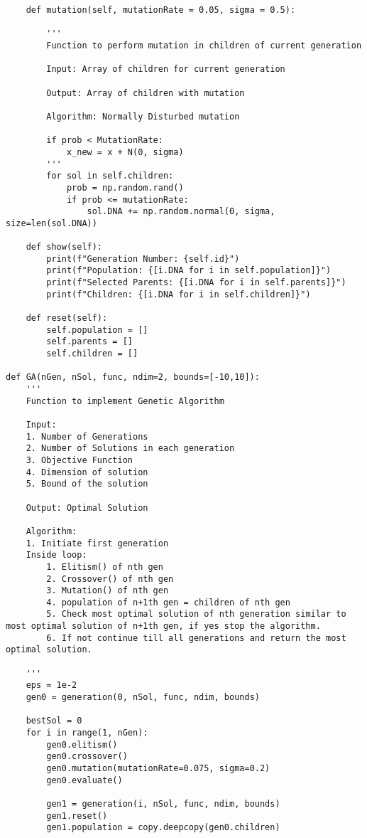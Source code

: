 \documentclass[12pt,a4paper,oneside]{paper} %
\begin{document}
\begin{verbatim}
    def mutation(self, mutationRate = 0.05, sigma = 0.5):

        '''
        Function to perform mutation in children of current generation

        Input: Array of children for current generation

        Output: Array of children with mutation

        Algorithm: Normally Disturbed mutation

        if prob < MutationRate:
            x_new = x + N(0, sigma)
        '''
        for sol in self.children:
            prob = np.random.rand()
            if prob <= mutationRate:
                sol.DNA += np.random.normal(0, sigma, size=len(sol.DNA))
        
    def show(self):
        print(f"Generation Number: {self.id}")
        print(f"Population: {[i.DNA for i in self.population]}")
        print(f"Selected Parents: {[i.DNA for i in self.parents]}")
        print(f"Children: {[i.DNA for i in self.children]}")

    def reset(self):
        self.population = []
        self.parents = []
        self.children = []

def GA(nGen, nSol, func, ndim=2, bounds=[-10,10]):
    '''
    Function to implement Genetic Algorithm

    Input: 
    1. Number of Generations
    2. Number of Solutions in each generation
    3. Objective Function
    4. Dimension of solution
    5. Bound of the solution

    Output: Optimal Solution

    Algorithm:
    1. Initiate first generation
    Inside loop:
        1. Elitism() of nth gen
        2. Crossover() of nth gen
        3. Mutation() of nth gen
        4. population of n+1th gen = children of nth gen
        5. Check most optimal solution of nth generation similar to most optimal solution of n+1th gen, if yes stop the algorithm.
        6. If not continue till all generations and return the most optimal solution.
    
    '''
    eps = 1e-2
    gen0 = generation(0, nSol, func, ndim, bounds)
    
    bestSol = 0
    for i in range(1, nGen):
        gen0.elitism()
        gen0.crossover()
        gen0.mutation(mutationRate=0.075, sigma=0.2)
        gen0.evaluate()

        gen1 = generation(i, nSol, func, ndim, bounds)
        gen1.reset()
        gen1.population = copy.deepcopy(gen0.children)


\end{verbatim}
\end{document}
